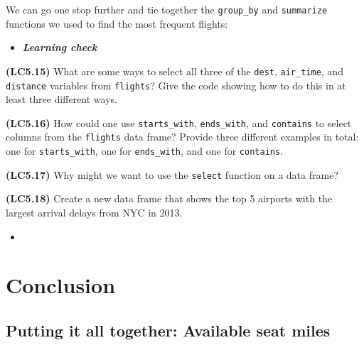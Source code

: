 \documentclass[12pt,]{krantz}
\makeatletter
\newenvironment{Shaded}{\begin{snugshade}}{\end{snugshade}}
\newcommand{\KeywordTok}[1]{\textcolor[rgb]{0.27,0.27,0.27}{\textbf{#1}}}
\newcommand{\DataTypeTok}[1]{\textcolor[rgb]{0.27,0.27,0.27}{#1}}
\newcommand{\DecValTok}[1]{\textcolor[rgb]{0.06,0.06,0.06}{#1}}
\newcommand{\StringTok}[1]{\textcolor[rgb]{0.5,0.5,0.5}{#1}}
\newcommand{\OperatorTok}[1]{\textcolor[rgb]{0.43,0.43,0.43}{\textbf{#1}}}
\newcommand{\NormalTok}[1]{#1}
\newenvironment{kframe}{%
\medskip{}
\setlength{\fboxsep}{.8em}
 \def\at@end@of@kframe{}%
 \ifinner\ifhmode%
  \def\at@end@of@kframe{\end{minipage}}%
  \begin{minipage}{\columnwidth}%
 \fi\fi%
 \def\FrameCommand##1{\hskip\@totalleftmargin \hskip-\fboxsep
 \colorbox{shadecolor}{##1}\hskip-\fboxsep
     \hskip-\linewidth \hskip-\@totalleftmargin \hskip\columnwidth}%
 \MakeFramed {\advance\hsize-\width
   \@totalleftmargin\z@ \linewidth\hsize
   \@setminipage}}%
 {\par\unskip\endMakeFramed%
 \at@end@of@kframe}
\renewenvironment{Shaded}{\begin{kframe}}{\end{kframe}}
\newenvironment{rmdblock}[1]
  {\begin{shaded*}
  \begin{itemize}
  \renewcommand{\labelitemi}{
    \raisebox{-.7\height}[0pt][0pt]{
    }
  }
  \item
  }
  {
  \end{itemize}
  \end{shaded*}
  }
\newenvironment{learncheck}
  {\begin{rmdblock}{warning}}
  {\end{rmdblock}}
\makeatother
\begin{document}
We can go one stop further and tie together the \texttt{group\_by} and
\texttt{summarize} functions we used to find the most frequent flights:

\begin{Shaded}
\end{Shaded}

\begin{learncheck}
\textbf{\emph{Learning check}}
\end{learncheck}

\textbf{(LC5.15)} What are some ways to select all three of the
\texttt{dest}, \texttt{air\_time}, and \texttt{distance} variables from
\texttt{flights}? Give the code showing how to do this in at least three
different ways.

\textbf{(LC5.16)} How could one use \texttt{starts\_with},
\texttt{ends\_with}, and \texttt{contains} to select columns from the
\texttt{flights} data frame? Provide three different examples in total:
one for \texttt{starts\_with}, one for \texttt{ends\_with}, and one for
\texttt{contains}.

\textbf{(LC5.17)} Why might we want to use the \texttt{select} function
on a data frame?

\textbf{(LC5.18)} Create a new data frame that shows the top 5 airports
with the largest arrival delays from NYC in 2013.

\begin{learncheck}

\end{learncheck}

\section{Conclusion}\label{conclusion-3}

\subsection{Putting it all together: Available seat
miles}\label{putting-it-all-together-available-seat-miles}
\end{document}

